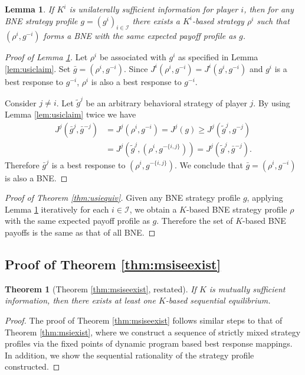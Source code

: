 \documentclass[pdflatex,sn-basic]{sn-jnl}
\newcommand{\Comp}{K}
\theoremstyle{thmstyleone}%
\newtheorem{thm}{Theorem}
\newtheorem{lemma}{Lemma}
\theoremstyle{thmstyletwo}%
\theoremstyle{thmstylethree}%
\begin{document}
\begin{appendices}
\begin{lemma}\label{lem:usireplace}
	If $\Comp^i$ is unilaterally sufficient information for player $i$, then for any BNE strategy profile $g=(g^i)_{i\in\mathcal{I}}$ there exists a $\Comp^i$-based strategy $\rho^i$ such that $(\rho^i, g^{-i})$ forms a BNE with the same expected payoff profile as $g$.
\end{lemma}

\begin{proof}[Proof of Lemma \ref{lem:usireplace}]
	Let $\rho^i$ be associated with $g^i$ as specified in Lemma \ref{lem:usiclaim}. Set $\bar{g} = (\rho^i, g^{-i})$. Since $J^i(\rho^i, g^{-i}) = J^i(g^i, g^{-i})$ and $g^i$ is a best response to $g^{-i}$, $\rho^i$ is also a best response to $g^{-i}$.
	
	Consider $j\neq i$. Let $\tilde{g}^j$ be an arbitrary behavioral strategy of player $j$. By using Lemma \ref{lem:usiclaim} twice we have
	\begin{align}
		J^j(\bar{g}^j, \bar{g}^{-j}) &= J^j(\rho^i, g^{-i}) = J^j(g)\geq J^j(\tilde{g}^j, g^{-j}) \\
		&= J^j(\tilde{g}^j, (\rho^i, g^{-\{i, j\}})) = J^j(\tilde{g}^j, \bar{g}^{-j}).
	\end{align}
	Therefore $\bar{g}^j$ is a best response to $(\rho^i, g^{-\{i, j\}})$. We conclude that $\bar{g} = (\rho^i, g^{-i})$ is also a BNE.
\end{proof}

\begin{proof}[Proof of Theorem \ref{thm:usiequiv}]
	Given any BNE strategy profile $g$, applying Lemma \ref{lem:usireplace} iteratively for each $i\in\mathcal{I}$, we obtain a $\Comp$-based BNE strategy profile $\rho$ with the same expected payoff profile as $g$. Therefore the set of $\Comp$-based BNE payoffs is the same as that of all BNE.
\end{proof}

\subsection{Proof of Theorem \ref{thm:msiseexist}}\label{app:thm:msiseexist}
\begin{thm}[Theorem \ref{thm:msiseexist}, restated]
	If $\Comp$ is mutually sufficient information, then there exists at least one $\Comp$-based sequential equilibrium.
\end{thm}

\begin{proof}
    {The proof of Theorem \ref{thm:msiseexist} follows similar steps to that of Theorem \ref{thm:msiexist}, where we construct a sequence of strictly mixed strategy profiles via the fixed points of dynamic program based best response mappings. In addition, we show the sequential rationality of the strategy profile constructed.}
    

\end{proof}
\end{appendices}
\end{document}
